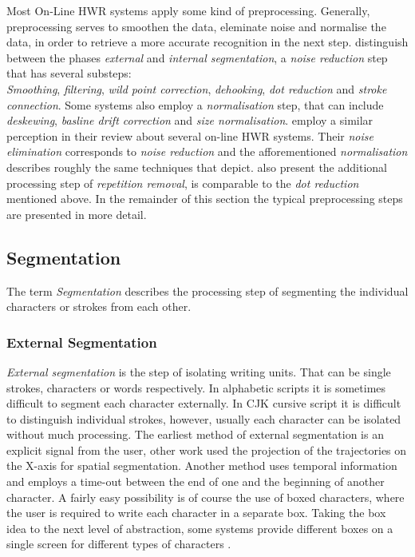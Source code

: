 Most On-Line HWR systems apply some kind of preprocessing. Generally, 
preprocessing serves to smoothen the data, eleminate noise and normalise the
data, in order to retrieve a more accurate recognition in the next step.
 distinguish between the phases \emph{external} and 
\emph{internal segmentation}, a \emph{noise reduction} step that has several 
substeps:\\
\emph{Smoothing}, \emph{filtering}, \emph{wild point correction}, 
\emph{dehooking}, \emph{dot reduction} and \emph{stroke connection}.
Some systems also employ a \emph{normalisation} step, that can include
\emph{deskewing}, \emph{basline drift correction} and \emph{size normalisation}.
 employ a similar perception in their review about several
on-line HWR systems. Their \emph{noise elimination} corresponds to 
\emph{noise reduction} and the afforementioned \emph{normalisation} describes 
roughly the same techniques that  depict.
 also present the additional processing step of 
\emph{repetition removal}, is comparable to the \emph{dot reduction} mentioned 
above. In the remainder of this section the typical preprocessing steps are 
presented in more detail.

\subsection{Segmentation}
\label{sec:segmentation}

The term \emph{Segmentation} describes the processing step of segmenting the 
individual characters or strokes from each other.

\subsubsection{External Segmentation}  
\label{sec:externasegmentation}
\emph{External segmentation} is the step of isolating writing units. That can be
single strokes, characters or words respectively. In alphabetic scripts it is 
sometimes difficult to segment each character externally. In CJK cursive script 
it is difficult to distinguish individual strokes, however, usually each 
character can be isolated without much processing.  
The earliest method of external segmentation is an explicit signal from the user,
other work used the projection of the trajectories on the X-axis for spatial
segmentation. Another method uses temporal information and employs a time-out
between the end of one and the beginning of another character.
A fairly easy possibility is of course the use of boxed characters, where the 
user is required to write each character in a separate box.
Taking the box idea to the next level of abstraction, some systems provide 
different boxes on a single screen for different types of characters 
.

